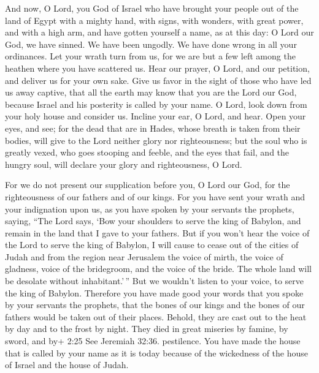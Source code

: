  And now, O Lord, you God of Israel who have brought your
people out of the land of Egypt with a mighty hand, with signs, with
wonders, with great power, and with a high arm, and have gotten yourself
a name, as at this day:  O Lord our God, we have sinned. We
have been ungodly. We have done wrong in all your ordinances.
 Let your wrath turn from us, for we are but a few left
among the heathen where you have scattered us.  Hear our
prayer, O Lord, and our petition, and deliver us for your own sake. Give
us favor in the sight of those who have led us away captive,
 that all the earth may know that you are the Lord our God,
because Israel and his posterity is called by your name.  O
Lord, look down from your holy house and consider us. Incline your ear,
O Lord, and hear.  Open your eyes, and see; for the dead
that are in Hades, whose breath is taken from their bodies, will give to
the Lord neither glory nor righteousness;  but the soul who
is greatly vexed, who goes stooping and feeble, and the eyes that fail,
and the hungry soul, will declare your glory and righteousness, O Lord.

 For we do not present our supplication before you, O Lord
our God, for the righteousness of our fathers and of our kings.
 For you have sent your wrath and your indignation upon us,
as you have spoken by your servants the prophets, saying, 
``The Lord says, `Bow your shoulders to serve the king of Babylon, and
remain in the land that I gave to your fathers.  But if you
won't hear the voice of the Lord to serve the king of Babylon,
 I will cause to cease out of the cities of Judah and from
the region near Jerusalem the voice of mirth, the voice of gladness,
voice of the bridegroom, and the voice of the bride. The whole land will
be desolate without inhabitant.'\,''  But we wouldn't
listen to your voice, to serve the king of Babylon. Therefore you have
made good your words that you spoke by your servants the prophets, that
the bones of our kings and the bones of our fathers would be taken out
of their places.  Behold, they are cast out to the heat by
day and to the frost by night. They died in great miseries by famine, by
sword, and by+ 2:25 See Jeremiah 32:36. pestilence.  You
have made the house that is called by your name as it is today because
of the wickedness of the house of Israel and the house of Judah.

